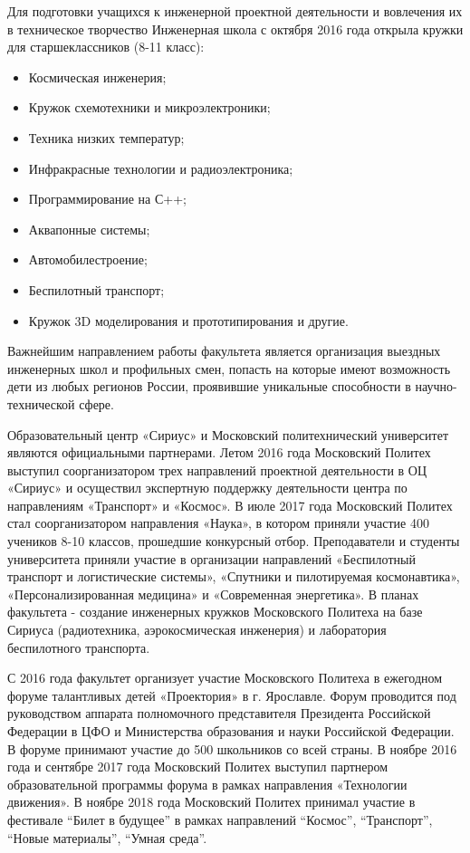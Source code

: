 Для подготовки учащихся к инженерной проектной деятельности и вовлечения их в техническое творчество Инженерная школа с октября 2016 года открыла кружки для старшеклассников (8-11 класс):
\begin{itemize}
    \item Космическая инженерия;
    \item Кружок схемотехники и микроэлектроники;
    \item Техника низких температур;
    \item Инфракрасные технологии и радиоэлектроника;
    \item Программирование на С++;
    \item Аквапонные системы;
    \item Автомобилестроение;
    \item Беспилотный транспорт;
    \item Кружок 3D моделирования и прототипирования и другие.
\end{itemize}

Важнейшим направлением работы факультета является организация выездных инженерных школ и профильных смен, попасть на которые имеют возможность дети из любых регионов России, проявившие уникальные способности в научно-технической сфере.

Образовательный центр «Сириус» и Московский политехнический университет являются официальными партнерами. Летом 2016 года Московский Политех выступил соорганизатором трех направлений проектной деятельности в ОЦ «Сириус» и осуществил экспертную поддержку деятельности центра по направлениям «Транспорт» и «Космос». В июле 2017 года Московский Политех стал соорганизатором направления «Наука», в котором приняли участие 400 учеников 8-10 классов, прошедшие конкурсный отбор. Преподаватели и студенты университета приняли участие в организации направлений «Беспилотный транспорт и логистические системы», «Спутники и пилотируемая космонавтика», «Персонализированная медицина» и «Современная энергетика». В планах факультета - создание инженерных кружков Московского Политеха на базе Сириуса (радиотехника, аэрокосмическая инженерия) и лаборатория беспилотного транспорта.

С 2016 года факультет организует участие Московского Политеха в ежегодном форуме талантливых детей «Проектория» в г. Ярославле. Форум проводится под руководством аппарата полномочного представителя Президента Российской Федерации в ЦФО и Министерства образования и науки Российской Федерации. В форуме принимают участие до 500 школьников со всей страны. В ноябре 2016 года и сентябре 2017 года Московский Политех выступил партнером образовательной программы форума в рамках направления «Технологии движения». В ноябре 2018 года Московский Политех принимал участие в фестивале “Билет в будущее” в рамках направлений “Космос”, “Транспорт”, “Новые материалы”, “Умная среда”.

